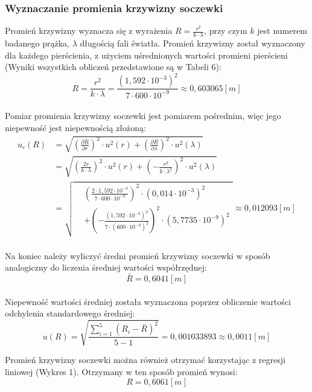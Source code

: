 \documentclass[polish, 11pt, a4paper]{article}
\begin{document}
	\subsubsection{Wyznaczanie promienia krzywizny soczewki}
		Promień krzywizny wyznacza się z wyrażenia \(R=\frac{r^2}{k\cdot \lambda}\), przy czym \(k\) jest numerem badanego prążka, \(\lambda\) długością fali światła.
		Promień krzywizny został wyznaczony dla każdego pierścienia, z użyciem uśrednionych wartości promieni pierścieni (Wyniki wszystkich obliczeń przedstawione są w Tabeli 6):\\
		\begin{displaymath}
		R=\frac{r^2}{k\cdot \lambda}=\frac{(1,592\cdot 10^{-3})^2}{7\cdot 600\cdot 10^{-9}}\approx 0,603065[m]
		\end{displaymath}\\
		Pomiar promienia krzywizny soczewki jest pomiarem pośrednim, więc jego niepewność jest niepewnością złożoną:
		\begin{align*}
		u_c(R)	&=\sqrt{\left(\frac{\partial R}{\partial r}\right)^2\cdot u^2(r)+\left(\frac{\partial R}{\partial \lambda}\right)^2\cdot u^2(\lambda)}\\
				&=\sqrt{\left(\frac{2r}{k\cdot \lambda}\right)^2\cdot u^2(r) + \left(-\frac{r^2}{k\cdot \lambda^2}\right)^2\cdot u^2(\lambda)}\\
				&=\sqrt{
					\begin{aligned}
					&\left(\frac{2\cdot 1,592\cdot 10^{-3}}{7\cdot 600\cdot 10^{-9}}\right)^2\cdot (0,014\cdot 10^{-3})^2\\ &+\left(-\frac{(1,592\cdot 10^{-3})^2}{7\cdot (600\cdot 10^{-9})^2}\right)^2\cdot (5,7735\cdot 10^{-9})^2
					\end{aligned}
				} \approx 0,012093[m]
		\end{align*}\\
		Na koniec należy wyliczyć średni promień krzywizny soczewki w sposób analogiczny do liczenia średniej wartości współrzędnej:
		\begin{displaymath}
			\bar{R}=0,6041[m]
		\end{displaymath}\\
		Niepewność wartości średniej została wyznaczona poprzez obliczenie wartości odchylenia standardowego średniej:
		\begin{displaymath}
			u(R)=\sqrt{\frac{\sum_{i=1}^{5}(R_i-\bar{R})^2}{5-1}}=0,001033893\approx 0,0011[m]
		\end{displaymath}
		
		Promień krzywizny soczewki można również otrzymać korzystając z regresji liniowej (Wykres 1). Otrzymany w ten sposób promień wynosi:
		\begin{displaymath}
		R=0,6061 [m]
		\end{displaymath}
		
\end{document}
